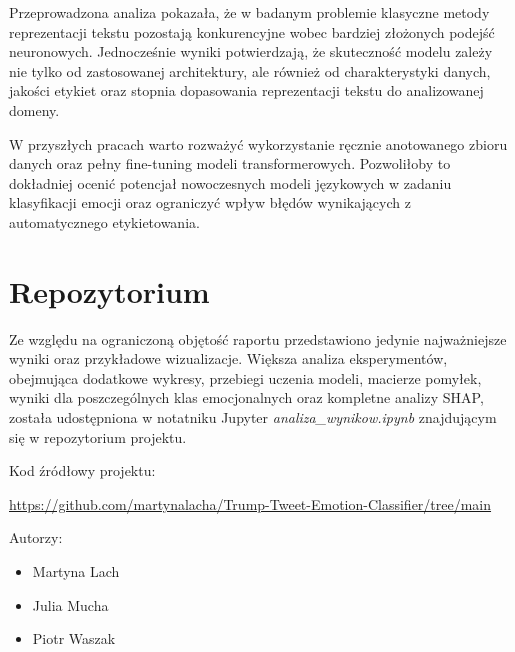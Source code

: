 \documentclass[a4paper,12pt]{article}
\begin{document}
Przeprowadzona analiza pokazała, że w badanym problemie klasyczne metody reprezentacji tekstu pozostają konkurencyjne wobec bardziej złożonych podejść neuronowych. Jednocześnie wyniki potwierdzają, że skuteczność modelu zależy nie tylko od zastosowanej architektury, ale również od charakterystyki danych, jakości etykiet oraz stopnia dopasowania reprezentacji tekstu do analizowanej domeny.

W przyszłych pracach warto rozważyć wykorzystanie ręcznie anotowanego zbioru danych oraz pełny fine-tuning modeli transformerowych. Pozwoliłoby to dokładniej ocenić potencjał nowoczesnych modeli językowych w zadaniu klasyfikacji emocji oraz ograniczyć wpływ błędów wynikających z automatycznego etykietowania.






\section*{Repozytorium}

\bigskip

Ze względu na ograniczoną objętość raportu przedstawiono jedynie najważniejsze wyniki oraz przykładowe wizualizacje. Większa analiza eksperymentów, obejmująca dodatkowe wykresy, przebiegi uczenia modeli, macierze pomyłek, wyniki dla poszczególnych klas emocjonalnych oraz kompletne analizy SHAP, została udostępniona w notatniku Jupyter \textit{analiza\_wynikow.ipynb} znajdującym się w repozytorium projektu.

Kod źródłowy projektu:

\url{https://github.com/martynalacha/Trump-Tweet-Emotion-Classifier/tree/main}

\bigskip

Autorzy:

\begin{itemize}
\item Martyna Lach
\item Julia Mucha
\item Piotr Waszak
\end{itemize}
\end{document}
